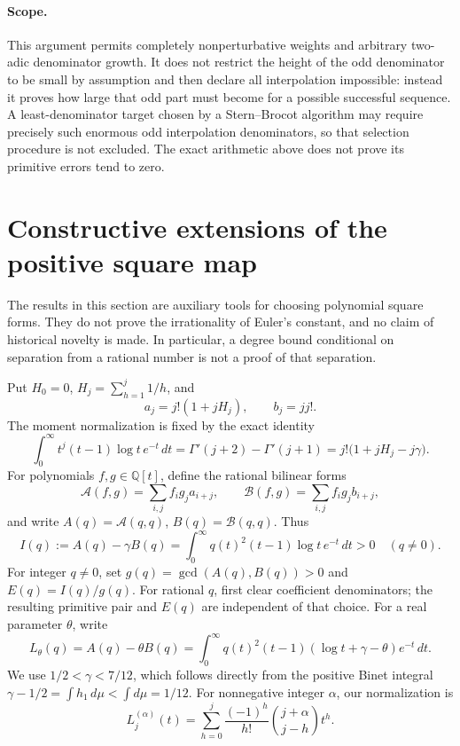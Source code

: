 \documentclass[11pt,a4paper]{article}
\theoremstyle{definition}
\theoremstyle{remark}
\begin{document}
\paragraph{Scope.}
This argument permits completely nonperturbative weights and arbitrary
two-adic denominator growth. It does not restrict the height of the odd
denominator to be small by assumption and then declare all interpolation
impossible: instead it proves how large that odd part must become for a
possible successful sequence. A least-denominator target chosen by a
Stern--Brocot algorithm may require precisely such enormous odd
interpolation denominators, so that selection procedure is not excluded.
The exact arithmetic above does not prove its primitive errors tend to zero.



\section{Constructive extensions of the positive square map}
\label{sea-square-section}

The results in this section are auxiliary tools for choosing polynomial
square forms.  They do not prove the irrationality of Euler's constant,
and no claim of historical novelty is made.  In particular, a degree bound
conditional on separation from a rational number is not a proof of that
separation.

Put $H_0=0$, $H_j=\sum_{h=1}^j1/h$, and
\[
 a_j=j!(1+jH_j),\qquad b_j=jj!.
\]
The moment normalization is fixed by the exact identity
\[
 \int_0^\infty t^j(t-1)\log t\,e^{-t}\,dt
 =\Gamma'(j+2)-\Gamma'(j+1)
 =j!\bigl(1+jH_j-j\gamma\bigr).
\]
For polynomials $f,g\in\mathbb Q[t]$, define the rational bilinear forms
\[
 \mathcal A(f,g)=\sum_{i,j}f_i g_j a_{i+j},\qquad
 \mathcal B(f,g)=\sum_{i,j}f_i g_j b_{i+j},
\]
and write $A(q)=\mathcal A(q,q)$, $B(q)=\mathcal B(q,q)$.  Thus
\begin{equation}
 I(q):=A(q)-\gamma B(q)
 =\int_0^\infty q(t)^2(t-1)\log t\,e^{-t}\,dt>0
 \quad(q\ne0).
 \label{sea-square-positive}
\end{equation}
For integer $q\ne0$, set $g(q)=\gcd(A(q),B(q))>0$ and
$E(q)=I(q)/g(q)$.  For rational $q$, first clear coefficient denominators;
the resulting primitive pair and $E(q)$ are independent of that choice.
For a real parameter $\theta$, write
\[
 L_\theta(q)=A(q)-\theta B(q)
 =\int_0^\infty q(t)^2(t-1)(\log t+\gamma-\theta)e^{-t}\,dt.
\]
We use $1/2<\gamma<7/12$, which follows directly from the positive Binet
integral $\gamma-1/2=\int h_1\,d\mu<\int d\mu=1/12$.
For nonnegative integer $\alpha$, our normalization is
\[
 L_j^{(\alpha)}(t)
   =\sum_{h=0}^j\frac{(-1)^h}{h!}\binom{j+\alpha}{j-h}t^h.
\]
\end{document}

